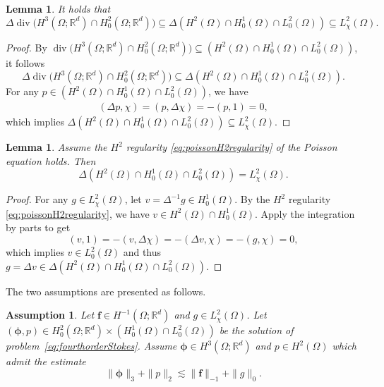 \documentclass[10pt]{amsart}
\newtheorem{lemma}[theorem]{Lemma}
\newtheorem{assumption}[theorem]{Assumption}
\renewcommand{\div}{\operatorname{div}}
\numberwithin{equation}{section}
\begin{document}
\begin{lemma}\label{lem:L2chi}
It holds that
$$
\Delta\div\big(H^3(\Omega;\mathbb R^d)\cap H_0^2(\Omega;\mathbb R^d)\big)\subseteq \Delta(H^2(\Omega)\cap H_0^1(\Omega)\cap L_0^2(\Omega)) \subseteq L^2_\chi(\Omega).
$$
\end{lemma}
\begin{proof}
By $\div\big(H^3(\Omega;\mathbb R^d)\cap H_0^2(\Omega;\mathbb R^d)\big)\subseteq (H^2(\Omega)\cap H_0^1(\Omega)\cap L_0^2(\Omega))$, it follows
$$
\Delta\div\big(H^3(\Omega;\mathbb R^d)\cap H_0^2(\Omega;\mathbb R^d)\big)\subseteq \Delta(H^2(\Omega)\cap H_0^1(\Omega)\cap L_0^2(\Omega)).
$$	
For any $p\in (H^2(\Omega)\cap H_0^1(\Omega)\cap L_0^2(\Omega))$, we have
\begin{align*}
(\Delta p,\chi)=(p,\Delta\chi)=-(p,1)=0,
\end{align*}
which implies $\Delta(H^2(\Omega)\cap H_0^1(\Omega)\cap L_0^2(\Omega)) \subseteq L^2_\chi(\Omega)$.
\end{proof}

\begin{lemma}
Assume the $H^2$ regularity \eqref{eq:poissonH2regularity} of the Poisson equation holds.
Then
\begin{equation}\label{eq:Deltasurjection}
\Delta(H^2(\Omega)\cap H_0^1(\Omega)\cap L_0^2(\Omega)) = L^2_\chi(\Omega).
\end{equation}
\end{lemma}
\begin{proof}
For any $g\in L^2_\chi(\Omega)$, let $v=\Delta^{-1}g\in H_0^1(\Omega)$.
By the $H^2$ regularity \eqref{eq:poissonH2regularity}, we have $v\in H^2(\Omega)\cap H_0^1(\Omega)$. Apply the integration by parts to get
$$
(v,1)=-(v,\Delta\chi)=-(\Delta v,\chi)=-(g,\chi)=0,
$$
which implies $v\in L_0^2(\Omega)$ and thus $g=\Delta v\in \Delta(H^2(\Omega)\cap H_0^1(\Omega)\cap L_0^2(\Omega))$.
\end{proof}

The two assumptions are presented as follows.
\begin{assumption}\label{RegularityAssumption1}
Let $\boldsymbol f \in H^{-1}(\Omega; \mathbb{R}^d)$ and $g\in L^2_\chi(\Omega)$. Let $(\boldsymbol\phi, p)\in H_0^2(\Omega; \mathbb R^d)\times(H_0^1(\Omega)\cap L_0^2(\Omega))$ be the solution of problem~\eqref{eq:fourthorderStokes}. Assume $\boldsymbol{\phi}\in H^3(\Omega; \mathbb R^d)$ and $p\in H^2(\Omega)$ which admit the estimate
\begin{equation}\label{eq:fourthorderStokesregularity1}
\|\boldsymbol\phi\|_3+\|p\|_2\lesssim \|\boldsymbol f\|_{-1} + \|g\|_{0}.
\end{equation}
\end{assumption}
\end{document}
